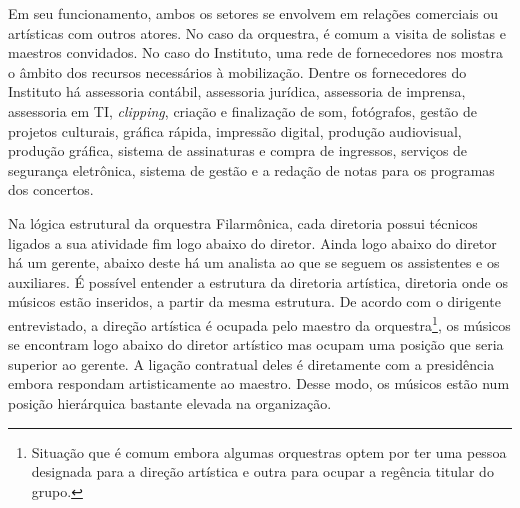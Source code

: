 \documentclass[a4paper, 12pt, openright, oneside, german, french, english, brazil]{abntex2}
\begin{document}








	Em seu funcionamento, ambos os setores se envolvem em relações comerciais ou artísticas com outros atores. No caso da orquestra, é comum a visita de solistas e maestros convidados. No caso do Instituto, uma rede de fornecedores nos mostra o âmbito dos recursos necessários à mobilização. Dentre os fornecedores do Instituto há assessoria contábil, assessoria jurídica, assessoria de imprensa, assessoria em TI, \textit{clipping}, criação e finalização de som, fotógrafos, gestão de projetos culturais, gráfica rápida, impressão digital, produção audiovisual, produção gráfica, sistema de assinaturas e compra de ingressos, serviços de segurança eletrônica, sistema de gestão e a redação de notas para os programas dos concertos.

	
	Na lógica estrutural da orquestra Filarmônica, cada diretoria possui técnicos ligados a sua atividade fim logo abaixo do diretor. Ainda logo abaixo do diretor há um gerente, abaixo deste há um analista ao que se seguem os assistentes e os auxiliares. É possível entender a estrutura da diretoria artística, diretoria onde os músicos estão inseridos, a partir da mesma estrutura. De acordo com o dirigente entrevistado, a direção artística é ocupada pelo maestro da orquestra\footnote{Situação que é comum embora algumas orquestras optem por ter uma pessoa designada para a direção artística e outra para ocupar a regência titular do grupo.}, os músicos se encontram logo abaixo do diretor artístico mas ocupam uma posição que seria superior ao gerente. A ligação contratual deles é diretamente com a presidência embora respondam artisticamente ao maestro. Desse modo, os músicos estão num posição hierárquica bastante elevada na organização.



\end{document}
